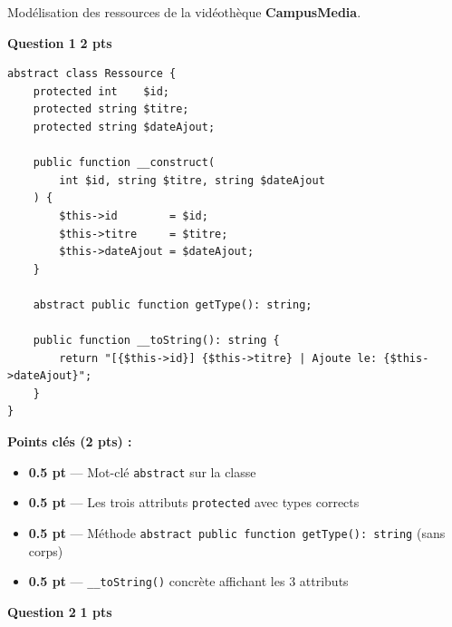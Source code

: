 \documentclass[11pt,a4paper]{article}
\newcommand{\pts}[1]{%
  \hfill\colorbox{pointsbg}{\textcolor{uirgold}{\bfseries\small #1 pts}}%
}
\begin{document}
\newpage

\begin{tcolorbox}[exbox, title={Exercice 3 \quad POO en PHP \hfill /9 pts}]
Modélisation des ressources de la vidéothèque \textbf{CampusMedia}.
\end{tcolorbox}

\noindent\textbf{Question 1}\pts{2}

\begin{tcolorbox}[corrbox, title={Corrigé Q1 --- Classe abstraite Ressource}]
\begin{lstlisting}[language=PHP2]
abstract class Ressource {
    protected int    $id;
    protected string $titre;
    protected string $dateAjout;

    public function __construct(
        int $id, string $titre, string $dateAjout
    ) {
        $this->id        = $id;
        $this->titre     = $titre;
        $this->dateAjout = $dateAjout;
    }

    abstract public function getType(): string;

    public function __toString(): string {
        return "[{$this->id}] {$this->titre} | Ajoute le: {$this->dateAjout}";
    }
}
\end{lstlisting}
\end{tcolorbox}

\begin{tcolorbox}[notebox]
\textbf{Points clés (2 pts) :}
\begin{itemize}[itemsep=1pt, topsep=0pt]
  \item \textbf{0.5 pt} --- Mot-clé \texttt{abstract} sur la classe
  \item \textbf{0.5 pt} --- Les trois attributs \texttt{protected} avec types corrects
  \item \textbf{0.5 pt} --- Méthode \texttt{abstract public function getType(): string} (sans corps)
  \item \textbf{0.5 pt} --- \texttt{\_\_toString()} concrète affichant les 3 attributs
\end{itemize}
\end{tcolorbox}

\bigskip

\noindent\textbf{Question 2}\pts{1}
\end{document}
